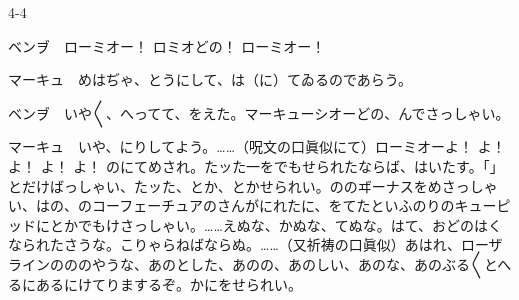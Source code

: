 \documentclass[tate,paper=b6j,jafontsize=9pt]{jlreq}
\begin{document}
\begin{azconvIndented}{4\zw}{-4\zw}

ベンヺ　ローミオー！ ロミオどの！ ローミオー！

マーキュ　めはぢゃ、とうにして、は（に）てゐるのであらう。

ベンヺ　いや{〳〵}、へってて、をえた。マーキューシオーどの、んでさっしゃい。

マーキュ　いや、にりしてよう。……（呪文の口眞似にて）ローミオーよ！ よ！ よ！ よ！ よ！ のにてめされ。たッた一をでもせられたならば、はいたす。「」とだけばっしゃい、たッた、とか、とかせられい。ののヸーナスをめさっしゃい、はの、のコーフェーチュアのさんがにれたに、をてたといふのりのキューピッドにとかでもけさっしゃい。……えぬな、かぬな、てぬな。はて、おどのはくなられたさうな。こりゃらねばならぬ。……（又祈祷の口眞似）あはれ、ローザラインのののやうな、あのとした、あのの、あのしい、あのな、あのぶる{〳〵}とへるにあるにけてりまするぞ。かにをせられい。


\end{azconvIndented}
\end{document}
